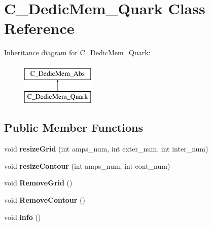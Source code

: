 \hypertarget{class_c___dedic_mem___quark}{\section{C\-\_\-\-Dedic\-Mem\-\_\-\-Quark Class Reference}
\label{class_c___dedic_mem___quark}
}
Inheritance diagram for C\-\_\-\-Dedic\-Mem\-\_\-\-Quark\-:\begin{figure}[H]
\begin{center}
\leavevmode
\includegraphics[height=2.000000cm]{class_c___dedic_mem___quark}
\end{center}
\end{figure}
\subsection*{Public Member Functions}
\begin{DoxyCompactItemize}
\item 
\hypertarget{class_c___dedic_mem___quark_af9870170bb87b11db976c64fa2ff87bb}{void {\bfseries resize\-Grid} (int amps\-\_\-num, int exter\-\_\-num, int inter\-\_\-num)}\label{class_c___dedic_mem___quark_af9870170bb87b11db976c64fa2ff87bb}

\item 
\hypertarget{class_c___dedic_mem___quark_af25f857d41fa0b568af4a11218580729}{void {\bfseries resize\-Contour} (int amps\-\_\-num, int cont\-\_\-num)}\label{class_c___dedic_mem___quark_af25f857d41fa0b568af4a11218580729}

\item 
\hypertarget{class_c___dedic_mem___quark_a868c98c7d5930a7fd0b4314d79092581}{void {\bfseries Remove\-Grid} ()}\label{class_c___dedic_mem___quark_a868c98c7d5930a7fd0b4314d79092581}

\item 
\hypertarget{class_c___dedic_mem___quark_aa2c1bd42ef41a11746d8ab96dcc70e75}{void {\bfseries Remove\-Contour} ()}\label{class_c___dedic_mem___quark_aa2c1bd42ef41a11746d8ab96dcc70e75}

\item 
\hypertarget{class_c___dedic_mem___quark_a7252d680bbd53e5c9a183fa49117d2e3}{void {\bfseries info} ()}\label{class_c___dedic_mem___quark_a7252d680bbd53e5c9a183fa49117d2e3}

\end{DoxyCompactItemize}
